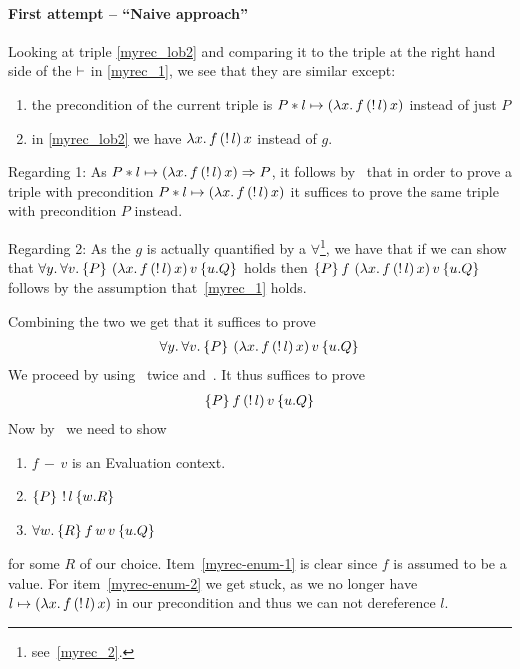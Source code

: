 \paragraph*{First attempt -- ``Naive approach''}
Looking at triple \eqref{myrec_lob2} and comparing it to the triple at the right hand side of the $\vdash$ in \eqref{myrec_1}, we see that they are similar except:
\begin{enumerate}
\item the precondition of the current triple is $P * l \mapsto \left(\lambda x.\, f \, (\mathop{!}{l})\, x  \right)$ instead of just $P$
\item in \eqref{myrec_lob2} we have $\lambda x.\, f \, (\mathop{!}{l})\, x $ instead of $g$.
\end{enumerate}

Regarding 1: As $P * l \mapsto \left(\lambda x.\, f \, (\mathop{!}{l})\, x  \right) \Rightarrow P$, it follows by~ that in order to prove a triple with precondition $P * l \mapsto \left(\lambda x.\, f \, (\mathop{!}{l})\, x  \right)$ it suffices to prove the same triple with precondition $P$ instead.

Regarding  2: As the $g$ is actually quantified by a $\forall$\footnote{see~\eqref{myrec_2}.}, we have that if we can show that $\All y . \All v. \hoare{P}{\left(\lambda x.\, f \, (\deref{l})\, x  \right) v}{u.Q }$ holds then $\hoare{P}{f \, \left(\lambda x.\, f \, (\deref{l})\, x  \right) v}{u.Q}$ follows by the assumption that~\eqref{myrec_1} holds.

Combining the two we get that it suffices to prove 
\begin{align}
\label{myrec_ht_1}
\All y . \All v. \hoare{P}{\left(\lambda x.\, f \, (\deref{l})\, x  \right) v}{u.Q }
\end{align}
We proceed by using~ twice and~. It thus suffices to prove 
\begin{align*}
\hoare{P}{ f \, (\deref{l})\, v}{u.Q }
\end{align*}
Now by~ we need to show
\begin{enumerate}
\item $f \, - \, v$ is an Evaluation context.
  \label{myrec-enum-1}
\item $\hoare{P} {\deref{l}} {w. R}$
  \label{myrec-enum-2}
\item $\All w. \hoare{R}{ f \, w\, v}{u.Q }$
  \label{myrec-enum-3}
\end{enumerate}
for some $R$ of our choice. Item~\eqref{myrec-enum-1} is clear since $f$ is assumed to be a value. For item~\eqref{myrec-enum-2} we get stuck, as we no longer have $l \mapsto \left(\lambda x.\, f \, (\mathop{!}{l})\, x  \right)$ in our precondition and thus we can not dereference $l$.

